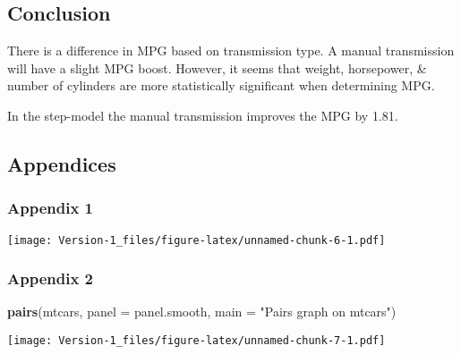 \documentclass[]{article}
\newenvironment{Shaded}{\begin{snugshade}}{\end{snugshade}}
\newcommand{\KeywordTok}[1]{\textcolor[rgb]{0.13,0.29,0.53}{\textbf{#1}}}
\newcommand{\DataTypeTok}[1]{\textcolor[rgb]{0.13,0.29,0.53}{#1}}
\newcommand{\StringTok}[1]{\textcolor[rgb]{0.31,0.60,0.02}{#1}}
\newcommand{\OperatorTok}[1]{\textcolor[rgb]{0.81,0.36,0.00}{\textbf{#1}}}
\newcommand{\NormalTok}[1]{#1}
\begin{document}
\subsection{Conclusion}\label{conclusion}

There is a difference in MPG based on transmission type. A manual
transmission will have a slight MPG boost. However, it seems that
weight, horsepower, \& number of cylinders are more statistically
significant when determining MPG.

In the step-model the manual transmission improves the MPG by 1.81.

\subsection{Appendices}\label{appendices}

\subsubsection{Appendix 1}\label{appendix-1}

\begin{Shaded}
\end{Shaded}

\texttt{[image: Version-1\_files/figure-latex/unnamed-chunk-6-1.pdf]}

\subsubsection{Appendix 2}\label{appendix-2}

\begin{Shaded}
\begin{Highlighting}[]
\KeywordTok{pairs}\NormalTok{(mtcars, }\DataTypeTok{panel =}\NormalTok{ panel.smooth, }\DataTypeTok{main =} \StringTok{"Pairs graph on mtcars"}\NormalTok{)}
\end{Highlighting}
\end{Shaded}

\texttt{[image: Version-1\_files/figure-latex/unnamed-chunk-7-1.pdf]}
\end{document}
